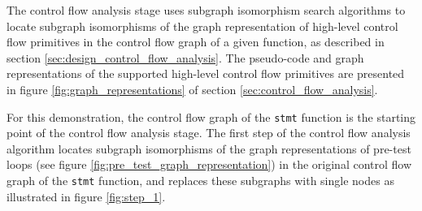 The control flow analysis stage uses subgraph isomorphism search algorithms to locate subgraph isomorphisms of the graph representation of high-level control flow primitives in the control flow graph of a given function, as described in section \ref{sec:design_control_flow_analysis}. The pseudo-code and graph representations of the supported high-level control flow primitives are presented in figure \ref{fig:graph_representations} of section \ref{sec:control_flow_analysis}.








For this demonstration, the control flow graph of the \texttt{stmt} function is the starting point of the control flow analysis stage. The first step of the control flow analysis algorithm locates subgraph isomorphisms of the graph representations of pre-test loops (see figure \ref{fig:pre_test_graph_representation}) in the original control flow graph of the \texttt{stmt} function, and replaces these subgraphs with single nodes as illustrated in figure \ref{fig:step_1}.

